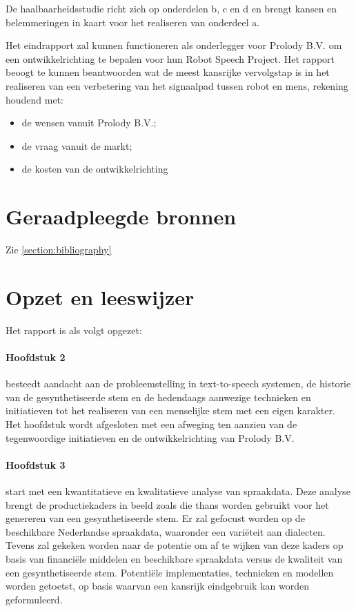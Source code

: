 De haalbaarheidsstudie richt zich op onderdelen b, c en d en brengt kansen en belemmeringen in kaart voor het realiseren van onderdeel a.

Het eindrapport zal kunnen functioneren als onderlegger voor Prolody B.V. om een ontwikkelrichting te bepalen voor hun Robot Speech Project. Het rapport beoogt te kunnen beantwoorden wat de meest kansrijke vervolgstap is in het realiseren van een verbetering van het signaalpad tussen robot en mens, rekening houdend met:
\begin{itemize}
    \item de wensen vanuit Prolody B.V.;
    \item de vraag vanuit de markt;
    \item de kosten van de ontwikkelrichting
\end{itemize}

\section{Geraadpleegde bronnen}

Zie \ref{section:bibliography}

\section{Opzet en leeswijzer}
Het rapport is als volgt opgezet:
\paragraph{Hoofdstuk 2} besteedt aandacht aan de probleemstelling in text-to-speech systemen, de historie van de gesynthetiseerde stem en de hedendaags aanwezige technieken en initiatieven tot het realiseren van een menselijke stem met een eigen karakter. Het hoofdstuk wordt afgesloten met een afweging ten aanzien van de tegenwoordige initiatieven en de ontwikkelrichting van Prolody B.V.

\paragraph{Hoofdstuk 3} start met een kwantitatieve en kwalitatieve analyse van spraakdata. Deze analyse brengt de productiekaders in beeld zoals die thans worden gebruikt voor het genereren van een gesynthetiseerde stem. Er zal gefocust worden op de beschikbare Nederlandse spraakdata, waaronder een variëteit aan dialecten. Tevens zal gekeken worden naar de potentie om af te wijken van deze kaders op basis van financiële middelen en beschikbare spraakdata versus de kwaliteit van een gesynthetiseerde stem. Potentiële implementaties, technieken en modellen worden getoetst, op basis waarvan een kansrijk eindgebruik kan worden geformuleerd.

